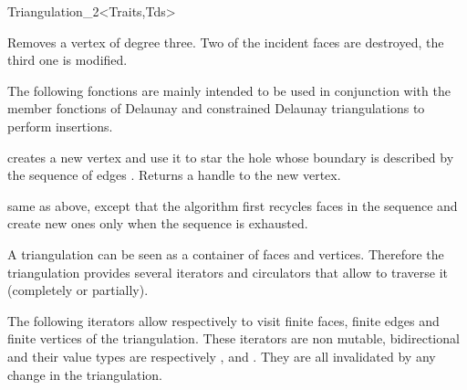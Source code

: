 \begin{ccRefClass}{Triangulation_2<Traits,Tds>}
\begin{ccAdvanced}
{Removes a vertex of degree three. Two of the incident faces are destroyed,
the third one is modified.
}

The following fonctions are mainly intended to be used in conjunction
with the  member fonctions of Delaunay and constrained 
Delaunay triangulations to perform insertions.

{creates a new vertex  and use it to star the hole 
whose boundary is described  by the sequence of edges \ccc{[edge_begin, 
edge_end[}. Returns a handle to the new vertex.}

{same as above, except that the  algorithm 
first recycles faces in the sequence \ccc{[face_begin, 
face_end[} 
and create new ones only when the sequence is exhausted.}
\end{ccAdvanced}




A triangulation can be seen as a container of faces and vertices.
Therefore the triangulation provides several iterators and circulators
that allow to traverse it (completely or partially).




The following iterators allow respectively to visit 
finite faces,  finite edges and  finite vertices
of the triangulation. These iterators are non mutable, bidirectional
and their value types are respectively
,  and . 
They are all invalidated by any change in the triangulation.

\ccGlue
{}

\ccGlue
{}


\end{ccRefClass}
